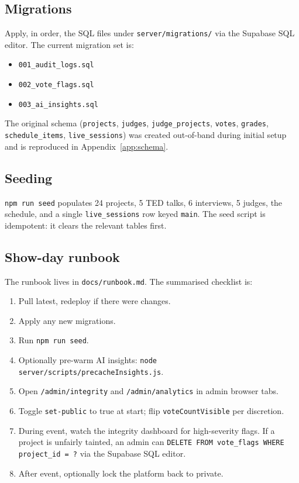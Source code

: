\subsection{Migrations}

Apply, in order, the SQL files under \texttt{server/migrations/} via the
Supabase SQL editor. The current migration set is:

\begin{itemize}[leftmargin=*]
  \item \texttt{001\_audit\_logs.sql}
  \item \texttt{002\_vote\_flags.sql}
  \item \texttt{003\_ai\_insights.sql}
\end{itemize}

The original schema (\texttt{projects}, \texttt{judges},
\texttt{judge\_projects}, \texttt{votes}, \texttt{grades},
\texttt{schedule\_items}, \texttt{live\_sessions}) was created out-of-band
during initial setup and is reproduced in
Appendix~\ref{app:schema}.

\subsection{Seeding}

\texttt{npm run seed} populates 24 projects, 5 TED talks, 6 interviews,
5 judges, the schedule, and a single \texttt{live\_sessions} row keyed
\texttt{main}. The seed script is idempotent: it clears the relevant
tables first.

\subsection{Show-day runbook}

The runbook lives in \texttt{docs/runbook.md}. The summarised checklist
is:

\begin{enumerate}[leftmargin=*]
  \item Pull latest, redeploy if there were changes.
  \item Apply any new migrations.
  \item Run \texttt{npm run seed}.
  \item Optionally pre-warm AI insights:
        \texttt{node server/scripts/precacheInsights.js}.
  \item Open \texttt{/admin/integrity} and \texttt{/admin/analytics} in
        admin browser tabs.
  \item Toggle \texttt{set-public} to true at start; flip
        \texttt{voteCountVisible} per discretion.
  \item During event, watch the integrity dashboard for high-severity
        flags. If a project is unfairly tainted, an admin can
        \texttt{DELETE FROM vote\_flags WHERE project\_id = ?} via the
        Supabase SQL editor.
  \item After event, optionally lock the platform back to private.
\end{enumerate}

